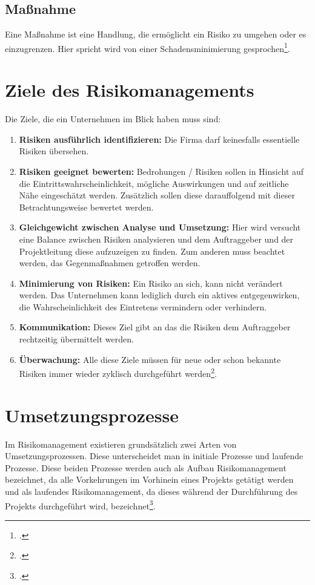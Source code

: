 \subsection{Maßnahme}
Eine Maßnahme ist eine Handlung, die ermöglicht ein Risiko zu umgehen oder es einzugrenzen. Hier spricht wird von einer Schadensminimierung gesprochen\footcite{risikomanagement-diplomarbeit}. 

\section{Ziele des Risikomanagements}
Die Ziele, die ein Unternehmen im Blick haben muss sind:
\begin{enumerate}
	\item \textbf{Risiken ausführlich identifizieren:} Die Firma darf keinesfalls essentielle Risiken übersehen.
	\item \textbf{Risiken geeignet bewerten:} Bedrohungen / Risiken sollen in Hinsicht auf die Eintrittswahrscheinlichkeit, mögliche Auswirkungen und auf zeitliche Nähe eingeschätzt werden. Zusätzlich sollen diese darauffolgend mit dieser Betrachtungsweise bewertet werden.
	\item \textbf{Gleichgewicht zwischen Analyse und Umsetzung:} Hier wird versucht eine Balance zwischen Risiken analysieren und dem Auftraggeber und der Projektleitung diese aufzuzeigen zu finden. Zum anderen muss beachtet werden, das Gegenmaßnahmen getroffen werden.
	\item \textbf{Minimierung von Risiken:} Ein Risiko an sich, kann nicht verändert werden. Das Unternehmen kann lediglich durch ein aktives entgegenwirken, die Wahrscheinlichkeit des Eintretens vermindern oder verhindern.
	\item \textbf{Kommunikation:} Dieses Ziel gibt an das die Risiken dem Auftraggeber rechtzeitig übermittelt werden.
	\item \textbf{Überwachung:} Alle diese Ziele müssen für neue oder schon bekannte Risiken immer wieder zyklisch durchgeführt werden\footcite{bva-risikomanagement}. 
\end{enumerate}

\section{Umsetzungsprozesse}
Im Risikomanagement existieren grundsätzlich zwei Arten von Umsetzungsprozessen. Diese unterscheidet man in initiale Prozesse und laufende Prozesse.
Diese beiden Prozesse werden auch als Aufbau Risikomanagement bezeichnet, da alle Vorkehrungen im Vorhinein eines Projekts getätigt werden und als laufendes Risikomanagement, da dieses während der Durchführung des Projekts durchgeführt wird, bezeichnet\footcite{bva-risikomanagement}.

